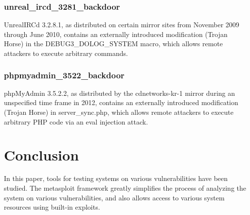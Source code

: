 \documentclass[14pt,a4paper,report]{report}
\begin{document}


\subsubsection{unreal\_ircd\_3281\_backdoor}

UnrealIRCd 3.2.8.1, as distributed on certain mirror sites from November 2009 through June 2010, contains an externally introduced modification (Trojan Horse) in the DEBUG3\_DOLOG\_SYSTEM macro, which allows remote attackers to execute arbitrary commands.



\subsubsection{phpmyadmin\_3522\_backdoor}

phpMyAdmin 3.5.2.2, as distributed by the cdnetworks-kr-1 mirror during an unspecified time frame in 2012, contains an externally introduced modification (Trojan Horse) in server\_sync.php, which allows remote attackers to execute arbitrary PHP code via an eval injection attack.



\section{Conclusion}

In this paper, tools for testing systems on various vulnerabilities have been studied. The metasploit framework greatly simplifies the process of analyzing the system on various vulnerabilities, and also allows access to various system resources using built-in exploits.
\end{document}
